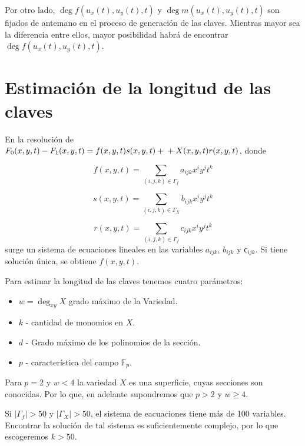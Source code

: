 \documentclass[12pt]{article}
\begin{document}
Por otro lado, $\deg f(u_x(t),u_y(t),t)$ y $\deg m(u_x(t),u_y(t),t)$ son fijados de antemano en el proceso de generación de las claves. Mientras mayor sea la diferencia entre ellos, mayor posibilidad habr\'a de encontrar  $\deg f(u_x(t),u_y(t),t)$.





\section*{Estimaci\'on de la longitud de las claves}
\noindent

En la resoluci\'on de $F_0(x,y,t) - F_1(x,y,t) = f(x,y,t)s(x,y,t) +\\+ X(x,y,t)r(x,y,t)$, donde 

$$f(x,y,t)=\sum_{(i,j,k)\in\Gamma_f} a_{ijk}x^i y^j t^k$$

$$s(x,y,t)=\sum_{(i,j,k)\in\Gamma_X} b_{ijk}x^i y^j t^k$$

$$r(x,y,t)=\sum_{(i,j,k)\in\Gamma_f} c_{ijk}x^i y^j t^k$$
surge un sistema de ecuaciones lineales en las variables $a_{ijk}$, $b_{ijk}$ y $с_{ijk}$. Si tiene soluci\'on \'unica, se obtiene $f(x,y,t)$. 

Para estimar la longitud de las claves tenemos cuatro par\'ametros:

\begin{itemize}
\item $w = \deg_{xy} X$ grado m\'aximo de la Variedad.
\item $k$ - cantidad de monomios en  $X$.
\item $d$ - Grado m\'aximo de los polinomios de la secci\'on. 
\item $p$ - caracter\'istica del campo $\mathbb{F}_p$.
\end{itemize} 

Para $p = 2$ y $w<4$ la variedad  $X$ es una superficie, cuyas secciones son conocidas. Por lo que, en adelante supondremos que  $p >2$ y $w\geq 4$. 

Si $|\Gamma_f|> 50$ y $|\Gamma_X|>50$, el sistema de eacuaciones tiene m\'as de 100 variables. Encontrar la soluci\'on de tal sistema es suficientemente complejo, por lo que escogeremos $k>50$. 
\end{document}
